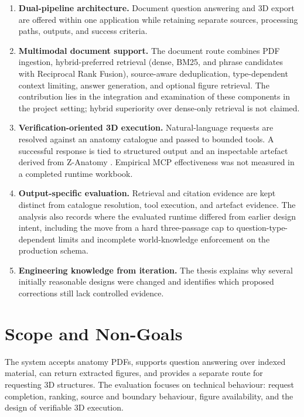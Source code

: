 \begin{enumerate}[label=\textbf{C\arabic*.},leftmargin=*,itemsep=0.35em,topsep=0.35em]
  \item \textbf{Dual-pipeline architecture.} Document question answering and 3D export are offered within one application while retaining separate sources, processing paths, outputs, and success criteria.

  \item \textbf{Multimodal document support.} The document route combines PDF ingestion, hybrid-preferred retrieval (dense, BM25, and phrase candidates with Reciprocal Rank Fusion), source-aware deduplication, type-dependent context limiting, answer generation, and optional figure retrieval. The contribution lies in the integration and examination of these components in the project setting; hybrid superiority over dense-only retrieval is not claimed.

  \item \textbf{Verification-oriented 3D execution.} Natural-language requests are resolved against an anatomy catalogue and passed to bounded \MCP{} tools. A successful response is tied to structured output and an inspectable artefact derived from Z-Anatomy \parencite{zanatomy}. Empirical MCP effectiveness was not measured in a completed runtime workbook.

  \item \textbf{Output-specific evaluation.} Retrieval and citation evidence are kept distinct from catalogue resolution, tool execution, and artefact evidence. The analysis also records where the evaluated runtime differed from earlier design intent, including the move from a hard three-passage cap to question-type-dependent limits and incomplete world-knowledge enforcement on the production schema.

  \item \textbf{Engineering knowledge from iteration.} The thesis explains why several initially reasonable designs were changed and identifies which proposed corrections still lack controlled evidence.
\end{enumerate}

\section{Scope and Non-Goals}
\label{sec:introduction-scope}

The system accepts anatomy PDFs, supports question answering over indexed material, can return extracted figures, and provides a separate route for requesting 3D structures. The evaluation focuses on technical behaviour: request completion, ranking, source and boundary behaviour, figure availability, and the design of verifiable 3D execution.

